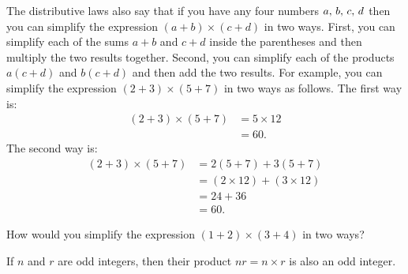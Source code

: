 \documentclass[a4paper,oneside,12pt]{article}
\begin{document}
The distributive laws also say that if you have any four numbers
${a},\, {b},\, {c},\, {d}$ then you can simplify the expression
$(a + b) \times (c + d)$ in two ways.  First, you can simplify each of
the sums $a + b$ and $c + d$ inside the parentheses and then multiply
the two results together.  Second, you can simplify each of the
products $a(c + d)$ and $b(c + d)$ and then add the two results.  For
example, you can simplify the expression $(2 + 3) \times (5 + 7)$ in
two ways as follows.  The first way is:
\begin{align*}
(2 + 3) \times (5 + 7)
&=
5 \times 12 \\[4pt]
&=
60.
\end{align*}
The second way is:
\begin{align*}
(2 + 3) \times (5 + 7)
&=
2(5 + 7) + 3(5 + 7) \\[4pt]
&=
(2 \times 12) + (3 \times 12) \\[4pt]
&=
24 + 36 \\[4pt]
&=
60.
\end{align*}

\begin{exercise}
How would you simplify the expression $(1 + 2) \times (3 + 4)$ in two
ways?
\end{exercise}


\begin{theorem}
If $n$ and $r$ are odd integers, then their product $nr = n \times r$
is also an odd integer.
\end{theorem}
\end{document}
